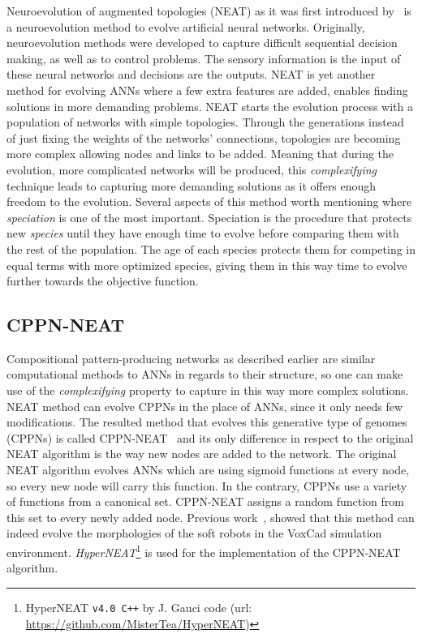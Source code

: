 \documentclass{sig-alternate}
\begin{document}
Neuroevolution of augmented topologies (NEAT) as it was first introduced by~\cite{stanley2002evolving} is a neuroevolution method to evolve artificial neural networks. Originally, neuroevolution methods were developed to capture difficult sequential decision making, as well as to control problems. The sensory information is the input of these neural networks and decisions are the outputs. NEAT is yet another method for evolving ANNs where a few extra features are added, enables finding solutions in more demanding problems. NEAT starts the evolution process with a population of networks with simple topologies. Through the generations instead of just fixing the weights of the networks' connections, topologies are becoming more complex allowing nodes and links to be added. Meaning that during the evolution, more complicated networks will be produced, this \emph{complexifying} technique leads to capturing more demanding solutions as it offers enough freedom to the evolution. Several aspects of this method worth mentioning where \emph{speciation} is one of the most important. Speciation is the procedure that protects new \emph{species} until they have enough time to evolve before comparing them with the rest of the population. The age of each species protects them for competing in equal terms with more optimized species, giving them in this way time to evolve further towards the objective function.


\subsection{CPPN-NEAT}

Compositional pattern-producing networks as described earlier are similar computational methods to ANNs in regards to their structure, so one can make use of the \emph{complexifying} property to capture in this way more complex solutions. NEAT method can evolve CPPNs in the place of ANNs, since it only needs few modifications. The resulted method that evolves this generative type of genomes (CPPNs) is called CPPN-NEAT~\cite{stanley2007compositional} and its only difference in respect to the original NEAT algorithm is the way new nodes are added to the network. The original NEAT algorithm evolves ANNs which are using sigmoid functions at every node, so every new node will carry this function. In the contrary, CPPNs use a variety of functions from a canonical set. CPPN-NEAT assigns a random function from this set to every newly added node. Previous work~\cite{cheney2013unshackling}, showed that this method can indeed evolve the morphologies of the soft robots in the VoxCad simulation environment. \textit{HyperNEAT}\footnote{HyperNEAT \texttt{v4.0 C++}  by J. Gauci code (url: \url{https://github.com/MisterTea/HyperNEAT})} is used for the implementation of the CPPN-NEAT algorithm.
\end{document}
